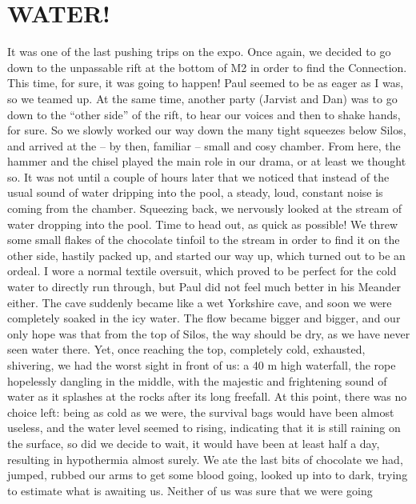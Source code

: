 
\section{WATER!}\label{water}

It was one of the last pushing trips on the expo. Once again, we decided
to go down to the unpassable rift at the bottom of M2 in order to find
the Connection. This time, for sure, it was going to happen! Paul seemed
to be as eager as I was, so we teamed up. At the same time, another
party (Jarvist and Dan) was to go down to the ``other side'' of the
rift, to hear our voices and then to shake hands, for sure. So we slowly
worked our way down the many tight squeezes below Silos, and arrived at
the -- by then, familiar -- small and cosy chamber. From here, the
hammer and the chisel played the main role in our drama, or at least we
thought so. It was not until a couple of hours later that we noticed
that instead of the usual sound of water dripping into the pool, a
steady, loud, constant noise is coming from the chamber. Squeezing back,
we nervously looked at the stream of water dropping into the pool. Time
to head out, as quick as possible! We threw some small flakes of the
chocolate tinfoil to the stream in order to find it on the other side,
hastily packed up, and started our way up, which turned out to be an
ordeal. I wore a normal textile oversuit, which proved to be perfect for
the cold water to directly run through, but Paul did not feel much
better in his Meander either. The cave suddenly became like a wet
Yorkshire cave, and soon we were completely soaked in the icy water. The
flow became bigger and bigger, and our only hope was that from the top
of Silos, the way should be dry, as we have never seen water there. Yet,
once reaching the top, completely cold, exhausted, shivering, we had the
worst sight in front of us: a 40 m high waterfall, the rope hopelessly
dangling in the middle, with the majestic and frightening sound of water
as it splashes at the rocks after its long freefall. At this point,
there was no choice left: being as cold as we were, the survival bags
would have been almost useless, and the water level seemed to rising,
indicating that it is still raining on the surface, so did we decide to
wait, it would have been at least half a day, resulting in hypothermia
almost surely. We ate the last bits of chocolate we had, jumped, rubbed
our arms to get some blood going, looked up into to dark, trying to
estimate what is awaiting us. Neither of us was sure that we were going

